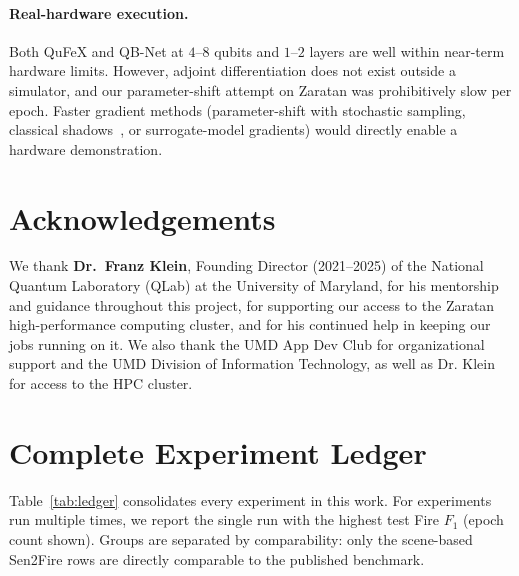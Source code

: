 \documentclass{article}
\begin{document}
\paragraph{Real-hardware execution.} Both QuFeX and QB-Net at $4$--$8$ qubits and $1$--$2$ layers are well within near-term hardware limits. However, adjoint differentiation does not exist outside a simulator, and our parameter-shift attempt on Zaratan was prohibitively slow per epoch. Faster gradient methods (parameter-shift with stochastic sampling, classical shadows~\cite{barren-plateaus}, or surrogate-model gradients) would directly enable a hardware demonstration.

\section*{Acknowledgements}

We thank \textbf{Dr.\ Franz Klein}, Founding Director (2021--2025) of the National Quantum Laboratory (QLab) at the University of Maryland, for his mentorship and guidance throughout this project, for supporting our access to the Zaratan high-performance computing cluster, and for his continued help in keeping our jobs running on it. We also thank the UMD App Dev Club for organizational support and the UMD Division of Information Technology, as well as Dr. Klein for access to the HPC cluster.

\appendix
\section{Complete Experiment Ledger}
\label{sec:ledger}

Table~\ref{tab:ledger} consolidates every experiment in this work. For experiments run multiple times, we report the single run with the highest test Fire $F_1$ (epoch count shown). Groups are separated by comparability: only the scene-based Sen2Fire rows are directly comparable to the published benchmark.
\end{document}
